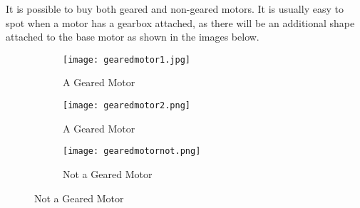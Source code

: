 \documentclass[../TinyBot.tex]{subfiles}
\begin{document}
It is possible to buy both geared and non-geared motors. It is usually easy to spot when a motor has a gearbox attached, as there will be an additional shape attached to the base motor as shown in the images below. 


\begin{figure}[h!]
    \centering
    \begin{subfigure}[t]{0.3\textwidth}
        \texttt{[image: gearedmotor1.jpg]}
        \caption*{A Geared Motor}
    \end{subfigure}
    \begin{subfigure}[t]{0.3\textwidth}
        \centering
        \texttt{[image: gearedmotor2.png]}
        \caption*{A Geared Motor}
    \end{subfigure}
    \begin{subfigure}[t]{0.3\textwidth}
        \texttt{[image: gearedmotornot.png]}
        \caption*{Not a Geared Motor}
    \end{subfigure}
\end{figure}



\end{document}
